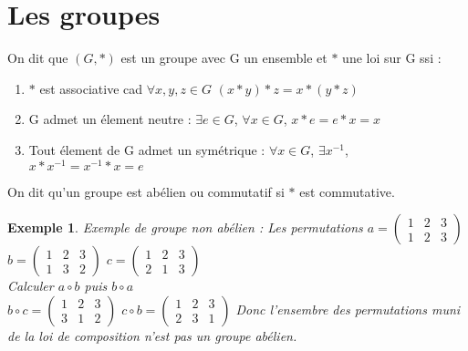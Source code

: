 \documentclass[12pt]{report}
\theoremstyle{break}%
\newtheorem{monex}{Exemple}[chapter]
\begin{document}
\section{Les groupes}
\begin{madef}
	On dit que $(G, \ast)$ est un groupe avec G un ensemble et $\ast$ une loi sur G ssi :
	\begin{enumerate}
		\item $\ast$ est associative cad $\forall x, y, z \in G$ $(x\ast y)\ast z = x*(y*z)$
		\item G admet un \'element neutre : $\exists e \in G$, $\forall x \in G$, $x*e=e*x=x $ 
		\item Tout \'element de G admet un sym\'etrique : \newline $\forall x \in G$, $\exists x^{-1}$, $x*x^{-1}=x^{-1}*x=e$
	\end{enumerate}
	On dit qu'un groupe est ab\'elien ou commutatif si $\ast$ est commutative. 
\end{madef}
\begin{monex}
	Exemple de groupe non ab\'elien : Les permutations \newline
	$a=(\begin{smallmatrix}
		1 & 2 & 3\\
		1 & 2 & 3 
	\end{smallmatrix})$
	$b=(\begin{smallmatrix}
		1 & 2 & 3\\
		1 & 3 & 2 
	\end{smallmatrix})$
	$c=(\begin{smallmatrix}
		1 & 2 & 3\\
		2 & 1 & 3 
	\end{smallmatrix})$
	\newline
	\\
	Calculer $a\circ b $ puis $b \circ a$ 
	\newline
	\\
	$b\circ c = (\begin{smallmatrix}
		1 & 2 & 3\\
		3 & 1 & 2 
	\end{smallmatrix})$
	\newline
	$c\circ b = (\begin{smallmatrix}
		1 & 2 & 3\\
		2 & 3 & 1 
	\end{smallmatrix})$
	\newline
	Donc l'ensembre des permutations muni de la loi de composition n'est pas un groupe ab\'elien.
\end{monex}
\end{document}
